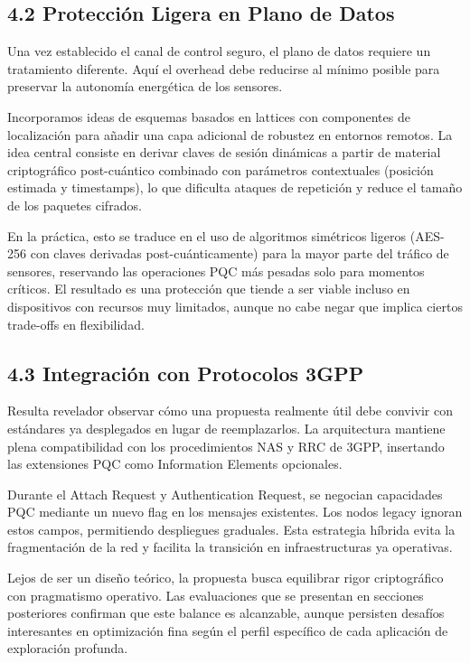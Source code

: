 \subsection{4.2 Protección Ligera en Plano de Datos}

Una vez establecido el canal de control seguro, el plano de datos requiere un tratamiento diferente. Aquí el overhead debe reducirse al mínimo posible para preservar la autonomía energética de los sensores.

Incorporamos ideas de esquemas basados en lattices con componentes de localización \cite{Althobaiti2021_QuantumResistant} para añadir una capa adicional de robustez en entornos remotos. La idea central consiste en derivar claves de sesión dinámicas a partir de material criptográfico post-cuántico combinado con parámetros contextuales (posición estimada y timestamps), lo que dificulta ataques de repetición y reduce el tamaño de los paquetes cifrados.

En la práctica, esto se traduce en el uso de algoritmos simétricos ligeros (AES-256 con claves derivadas post-cuánticamente) para la mayor parte del tráfico de sensores, reservando las operaciones PQC más pesadas solo para momentos críticos. El resultado es una protección que tiende a ser viable incluso en dispositivos con recursos muy limitados, aunque no cabe negar que implica ciertos trade-offs en flexibilidad.

\subsection{4.3 Integración con Protocolos 3GPP}

Resulta revelador observar cómo una propuesta realmente útil debe convivir con estándares ya desplegados en lugar de reemplazarlos. La arquitectura mantiene plena compatibilidad con los procedimientos NAS y RRC de 3GPP, insertando las extensiones PQC como Information Elements opcionales.

Durante el Attach Request y Authentication Request, se negocian capacidades PQC mediante un nuevo flag en los mensajes existentes. Los nodos legacy ignoran estos campos, permitiendo despliegues graduales. Esta estrategia híbrida evita la fragmentación de la red y facilita la transición en infraestructuras ya operativas.

Lejos de ser un diseño teórico, la propuesta busca equilibrar rigor criptográfico con pragmatismo operativo. Las evaluaciones que se presentan en secciones posteriores confirman que este balance es alcanzable, aunque persisten desafíos interesantes en optimización fina según el perfil específico de cada aplicación de exploración profunda.